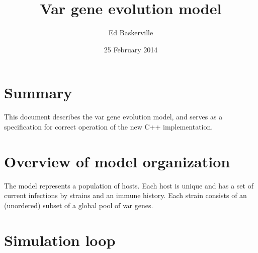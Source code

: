 \documentclass[11pt]{article}
\title{Var gene evolution model}
\author{Ed Baskerville}
\date{25 February 2014}
\begin{document}
\maketitle

\section{Summary}

This document describes the var gene evolution model, and serves as a specification for correct operation of the new C++ implementation.

\section{Overview of model organization}

The model represents a population of hosts. Each host is unique and has a set of current infections by strains and an immune history. Each strain consists of an (unordered) subset of a global pool of var genes.

\section{Simulation loop}
\end{document}
